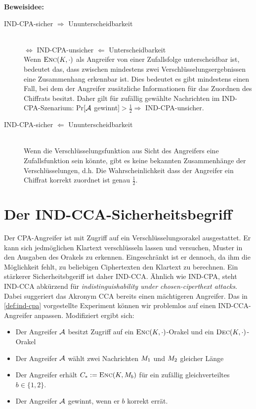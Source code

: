 \noindent
\textbf{Beweisidee:}
\begin{description}
	\item[IND-CPA-sicher $\Rightarrow$ Ununterscheidbarkeit]~\\
		$\Leftrightarrow$ IND-CPA-unsicher $\Leftarrow$ Unterscheidbarkeit~\\
		Wenn $\textsc{Enc}(K, \cdot)$ als Angreifer von einer Zufallsfolge unterscheidbar ist, bedeutet das, dass zwischen mindestens zwei Verschlüsselungsergebnissen eine Zusammenhang erkennbar ist. Dies bedeutet es gibt mindestens einen Fall, bei dem der Angreifer zusätzliche Informationen für das Zuordnen des Chiffrats besitzt. Daher gilt für zufällig gewählte Nachrichten im IND-CPA-Szenarium: Pr$[\mathcal{A}$ gewinnt$] > \frac{1}{2} \Rightarrow$ IND-CPA-unsicher.
	\item[IND-CPA-sicher $\Leftarrow$ Ununterscheidbarkeit]~\\
		Wenn die Verschlüsselungsfunktion aus Sicht des Angreifers eine Zufallsfunktion sein könnte, gibt es keine bekannten Zusammenhänge der Verschlüsselungen, d.h. Die Wahrscheinlichkeit dass der Angreifer ein Chiffrat korrekt zuordnet ist genau $\frac{1}{2}$.
\end{description}

\section{Der IND-CCA-Sicherheitsbegriff}
Der CPA-Angreifer ist mit Zugriff auf ein Verschlüsselungsorakel ausgestattet. Er kann sich jedmöglichen Klartext verschlüsseln lassen und
versuchen, Muster in den Ausgaben des Orakels zu erkennen. Eingeschränkt ist er dennoch, da ihm die Möglichkeit fehlt, zu beliebigen
Ciphertexten den Klartext zu berechnen. Ein stärkerer Sicherheitsbgeriff ist daher IND-CCA. Ähnlich wie IND-CPA, steht IND-CCA abkürzend für \emph{indistinguishability under chosen-ciperthext attacks}. Dabei suggeriert das Akronym CCA bereits einen mächtigeren Angreifer. Das in \ref{def:ind-cpa} vorgestellte Experiment können wir problemlos auf einen IND-CCA-Angreifer anpassen. Modifiziert ergibt sich:

\begin{itemize}
	\item Der Angreifer $\mathcal{A}$ besitzt Zugriff auf ein $\textsc{Enc}(K,\cdot)$-Orakel und ein $\textsc{Dec}(K,\cdot)$-Orakel
	\item Der Angreifer $\mathcal{A}$ wählt zwei Nachrichten $M_1$ und $M_2$ gleicher Länge
	\item Der Angreifer erhält $C_* := \textsc{Enc}(K, M_{b})$  für ein zufällig gleichverteiltes $b \in \{1, 2\}$.
	\item Der Angreifer $\mathcal{A}$ gewinnt, wenn er $b$ korrekt errät.
\end{itemize} 

